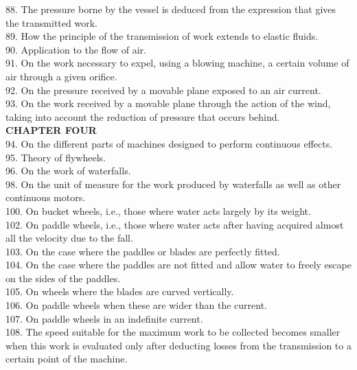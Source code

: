 \documentclass{book}
\begin{document}
88. The pressure borne by the vessel is deduced from the expression that gives the transmitted work. \\
89. How the principle of the transmission of work extends to elastic fluids. \\
90. Application to the flow of air. \\
91. On the work necessary to expel, using a blowing machine, a certain volume of air through a given orifice. \\
92. On the pressure received by a movable plane exposed to an air current. \\
93. On the work received by a movable plane through the action of the wind, taking into account the reduction of pressure that occurs behind. \\
\textbf{CHAPTER FOUR} \\
94. On the different parts of machines designed to perform continuous effects. \\
95. Theory of flywheels. \\
96. On the work of waterfalls. \\
98. On the unit of measure for the work produced by waterfalls as well as other continuous motors. \\
100. On bucket wheels, i.e., those where water acts largely by its weight. \\
102. On paddle wheels, i.e., those where water acts after having acquired almost all the velocity due to the fall. \\
103. On the case where the paddles or blades are perfectly fitted. \\
104. On the case where the paddles are not fitted and allow water to freely escape on the sides of the paddles. \\
105. On wheels where the blades are curved vertically. \\
106. On paddle wheels when these are wider than the current. \\
107. On paddle wheels in an indefinite current. \\
108. The speed suitable for the maximum work to be collected becomes smaller when this work is evaluated only after deducting losses from the transmission to a certain point of the machine. \\
\end{document}
